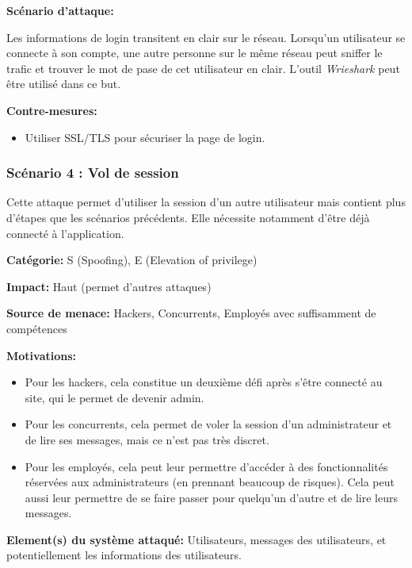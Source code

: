 \documentclass{article}
\begin{document}
\textbf{Scénario d'attaque:}

Les informations de login transitent en clair sur le réseau. Lorsqu'un
utilisateur se connecte à son compte, une autre personne sur le même
réseau peut sniffer le trafic et trouver le mot de pase de cet
utilisateur en clair. L'outil \emph{Wrieshark} peut être utilisé dans ce
but.

\textbf{Contre-mesures:}

\begin{itemize}

\item
  Utiliser SSL/TLS pour sécuriser la page de login.
\end{itemize}

\subsubsection{Scénario 4 : Vol de session}

Cette attaque permet d'utiliser la session d'un autre utilisateur mais
contient plus d'étapes que les scénarios précédents. Elle nécessite
notamment d'être déjà connecté à l'application.

\textbf{Catégorie:} S (Spoofing), E (Elevation of privilege)

\textbf{Impact:} Haut (permet d'autres attaques)

\textbf{Source de menace:} Hackers, Concurrents, Employés avec
suffisamment de compétences

\textbf{Motivations:}

\begin{itemize}

\item
  Pour les hackers, cela constitue un deuxième défi après s'être
  connecté au site, qui le permet de devenir admin.
\item
  Pour les concurrents, cela permet de voler la session d'un
  administrateur et de lire ses messages, mais ce n'est pas très
  discret.
\item
  Pour les employés, cela peut leur permettre d'accéder à des
  fonctionnalités réservées aux administrateurs (en prennant beaucoup de
  risques). Cela peut aussi leur permettre de se faire passer pour
  quelqu'un d'autre et de lire leurs messages.
\end{itemize}

\textbf{Element(s) du système attaqué:} Utilisateurs, messages des
utilisateurs, et potentiellement les informations des utilisateurs.
\end{document}
